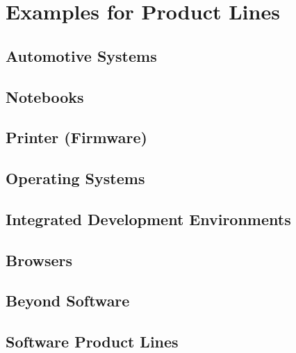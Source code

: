 

\subtitle{1. Introduction}
\author{Thomas Thüm}





\section{Examples for Product Lines}

\subsection{Automotive Systems}
\subsection{Notebooks}
\subsection{Printer (Firmware)}
\subsection{Operating Systems}
\subsection{Integrated Development Environments}
\subsection{Browsers}
\subsection{Beyond Software}



\subsection{Software Product Lines}
